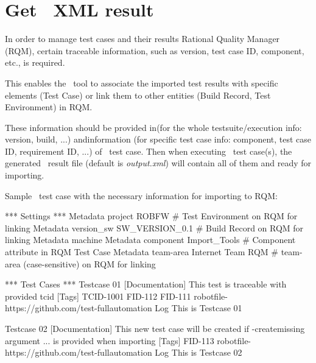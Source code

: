 



\hypertarget{description-get-robotframework-xml-result}{%
\section{Get \rfwcore\ XML result}
\label{description-get-robotframework-xml-result}}

In order to manage test cases and their results Rational Quality Manager (RQM),
certain traceable information, such as version, test case ID, component, etc.,
is required.

This enables the \pkg\ tool to associate the imported test results with
specific elements (Test Case) or link them to other entities (Build Record,
Test Environment) in RQM.

These information should be provided in(for the whole
testsuite/execution info: version, build, ...) and\rcode{{[}Tags{]}}information
(for specific test case info: component, test case ID, requirement ID, ...) of
\rfwcore\ test case.
Then when executing \rfwcore\ test case(s), the generated \rfwcore\ result file
(default is \emph{output.xml}) will contain all of them and ready for importing.

Sample \rfwcore\ test case with the necessary information for importing to RQM:

\begin{robotcode}[caption=Sample \rfwcore\ test case,
          linebackgroundcolor=\hlcode{2,3,4}]
*** Settings ***
Metadata  project    ROBFW       # Test Environment on RQM for linking
Metadata  version_sw  SW_VERSION_0.1  # Build Record on RQM for linking
Metadata  machine    %
Metadata  component  Import_Tools    # Component attribute in RQM Test Case
Metadata  team-area  Internet Team RQM  # team-area (case-sensitive) on RQM for linking

*** Test Cases ***
Testcase 01
  [Documentation]  This test is traceable with provided tcid
  [Tags]  TCID-1001  FID-112  FID-111  robotfile-https://github.com/test-fullautomation
  Log    This is Testcase 01

Testcase 02
  [Documentation]  This new test case will be created if -createmissing argument
        ...  is provided when importing
  [Tags]  FID-113  robotfile-https://github.com/test-fullautomation
  Log    This is Testcase 02
\end{robotcode}

